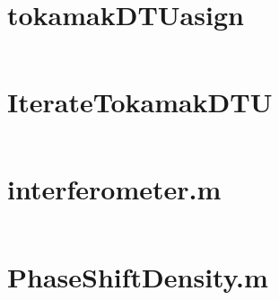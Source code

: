 \appendix
\appendixpage
\addappheadtotoc
\section{tokamakDTU\textunderscore asign}\label{tokamakDTU_asign_1}
\inputminted[bgcolor=Black,linenos=true]{matlab}{Listings/tokamakDTU_asign_1.m}\newpage
\section{IterateTokamakDTU}\label{IterateTokamakDTU}
\inputminted[bgcolor=Black,linenos=true]{matlab}{Listings/IterateTokamakDTU.m}\newpage
\section{interferometer.m}\label{inter}
\inputminted[bgcolor=Black,linenos=true]{matlab}{Listings/interferometer.m}
\section{PhaseShiftDensity.m}
\inputminted[bgcolor=Black,linenos=true]{matlab}{Listings/PhaseShiftDensity.m}\label{PSD}
